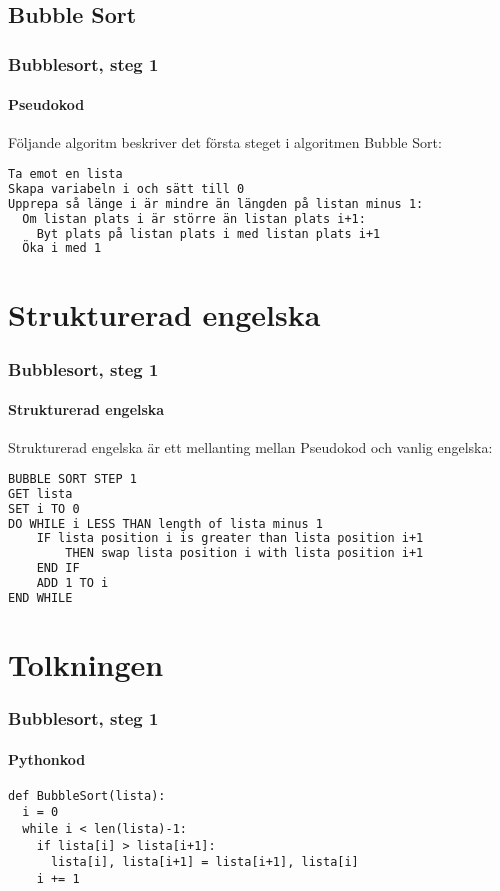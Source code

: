 \documentclass[aspectratio=169]{beamer}
\begin{document}
\subsection{Bubble Sort}

\begin{frame}[fragile]
\frametitle{Bubblesort, steg 1}
\framesubtitle{Pseudokod}

Följande algoritm beskriver det första steget i algoritmen Bubble Sort:

\begin{lstlisting}[language=TeX]
Ta emot en lista
Skapa variabeln i och sätt till 0
Upprepa så länge i är mindre än längden på listan minus 1:
  Om listan plats i är större än listan plats i+1:
    Byt plats på listan plats i med listan plats i+1
  Öka i med 1
\end{lstlisting}

\end{frame}

\section{Strukturerad engelska}

\begin{frame}[fragile]
	\frametitle{Bubblesort, steg 1}
	\framesubtitle{Strukturerad engelska}

Strukturerad engelska är ett mellanting mellan Pseudokod och vanlig engelska:

\begin{lstlisting}[language=TeX]
BUBBLE SORT STEP 1
GET lista
SET i TO 0
DO WHILE i LESS THAN length of lista minus 1
	IF lista position i is greater than lista position i+1
		THEN swap lista position i with lista position i+1 
	END IF
	ADD 1 TO i
END WHILE
\end{lstlisting}

\end{frame}

\section{Tolkningen}

\begin{frame}[fragile]
	\frametitle{Bubblesort, steg 1}
	\framesubtitle{Pythonkod}

\begin{lstlisting}
def BubbleSort(lista):
  i = 0
  while i < len(lista)-1:
    if lista[i] > lista[i+1]:
      lista[i], lista[i+1] = lista[i+1], lista[i]
    i += 1
\end{lstlisting}

\end{frame}
\end{document}
